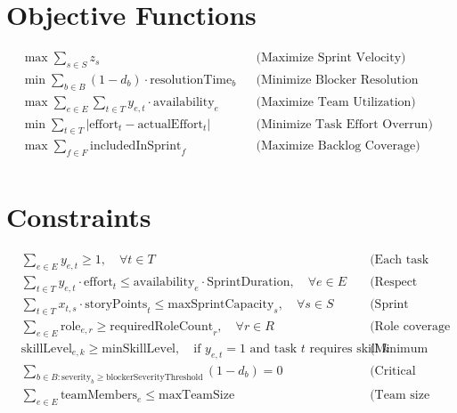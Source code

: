 \documentclass{article}
\begin{document}
\section*{Objective Functions}
\begin{align*}
    & \max \sum_{s \in S} z_{s} && \text{(Maximize Sprint Velocity)} \\
    & \min \sum_{b \in B} (1 - d_b) \cdot \text{resolutionTime}_b && \text{(Minimize Blocker Resolution Time)} \\
    & \max \sum_{e \in E} \sum_{t \in T} y_{e,t} \cdot \text{availability}_e && \text{(Maximize Team Utilization)} \\
    & \min \sum_{t \in T} | \text{effort}_t - \text{actualEffort}_t | && \text{(Minimize Task Effort Overrun)} \\
    & \max \sum_{f \in F} \text{includedInSprint}_f && \text{(Maximize Backlog Coverage)} \\
\end{align*}

\section*{Constraints}
\begin{align*}
    & \sum_{e \in E} y_{e,t} \geq 1, \quad \forall t \in T && \text{(Each task assigned to at least one employee)} \\
    & \sum_{t \in T} y_{e,t} \cdot \text{effort}_t \leq \text{availability}_e \cdot \text{SprintDuration}, \quad \forall e \in E && \text{(Respect employee availability)} \\
    & \sum_{t \in T} x_{t,s} \cdot \text{storyPoints}_t \leq \text{maxSprintCapacity}_s, \quad \forall s \in S && \text{(Sprint capacity limits)} \\
    & \sum_{e \in E} \text{role}_{e,r} \geq \text{requiredRoleCount}_r, \quad \forall r \in R && \text{(Role coverage constraints)} \\
    & \text{skillLevel}_{e,k} \geq \text{minSkillLevel}, \quad \text{if } y_{e,t}=1 \text{ and task } t \text{ requires skill } k && \text{(Minimum skill level)} \\
    & \sum_{b \in B: \text{severity}_b \geq \text{blockerSeverityThreshold}} (1 - d_b) = 0 && \text{(Critical blockers must be resolved)} \\
    & \sum_{e \in E} \text{teamMembers}_e \leq \text{maxTeamSize} && \text{(Team size limit)} \\
\end{align*}
\end{document}
